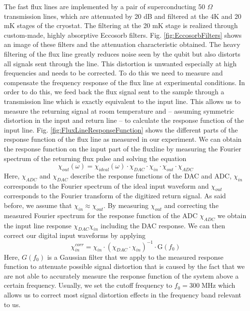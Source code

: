 The fast flux lines are implemented by a pair of superconducting 50 $\Omega$ transmission lines, which are attenuated by 20 dB and filtered at the 4K and 20 mK stages of the cryostat. The filtering at the 20 mK stage is realized through custom-made, highly absorptive Eccosorb filters. Fig. \ref{fig:EccosorbFilters} shows an image of these filters and the attenuation characteristic obtained. The heavy filtering of the flux line greatly reduces noise seen by the qubit but also distorts all signals sent through the line. This distortion is unwanted especially at high frequencies and needs to be corrected. To do this we need to measure and compensate the frequency response of the flux line at experimental conditions. In order to do this, we feed back the flux signal sent to the sample through a transmission line which is exactly equivalent to the input line. This allows us to measure the returning signal at room temperature and -- assuming symmetric distortion in the input and return line -- to calculate the response function of the input line. Fig. \ref{fig:FluxLineResponseFunction} shows the different parts of the response function of the flux line as measured in our experiment. We can obtain the response function on the input part of the fluxline by measuring the Fourier spectrum of the returning flux pulse and solving the equation
%
\begin{equation}
\chi_{out}(\omega) = \chi_{ideal}(\omega)\cdot \chi_{DAC}\cdot \chi_{in} \cdot \chi_{out}\cdot\chi_{ADC}
\end{equation}
%
Here, $\chi_{ADC}$ and $\chi_{DAC}$ describe the response functions of the DAC and ADC, $\chi_{in}$ corresponds to the Fourier spectrum of the ideal input waveform and $\chi_{out}$ corresponds to the Fourier transform of the digitized return signal. As said before, we assume that $\chi_{in}\approx\chi_{out}$. By measuring $\chi_{out}$ and correcting the measured Fourier spectrum for the response function of the ADC $\chi_{ADC}$ we obtain the input line response $\chi_{DAC}\chi_{in}$ including the DAC response. We can then correct our digital input waveforms by applying
%
\begin{equation}
\chi_{in}^{corr} = \chi_{in}\cdot (\chi_{DAC}\cdot\chi_{in})^{-1}\cdot \mathrm{G}(f_0)
\end{equation}
%
Here, $G(f_0)$ is a Gaussian filter that we apply to the measured response function to attenuate possible signal distortion that is caused by the fact that we are not able to accurately measure the response function of the system above a certain frequency. Usually, we set the cutoff frequency to $f_0=300\;\mathrm{MHz}$ which allows us to correct most signal distortion effects in the frequency band relevant to us.

